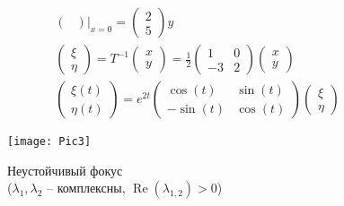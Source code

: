 \begin{figure}[!h]
\begin{minipage}[h]{0.49\linewidth}
\begin{gather*}
\begin{pmatrix}
			\end{pmatrix}
			|_{x = 0} =
			\begin{pmatrix}
				2 \\ 5
			\end{pmatrix}
			y\\
			\begin{pmatrix}
				\xi \\ \eta
			\end{pmatrix} =
			T^{-1}
			\begin{pmatrix}
				x \\ y
			\end{pmatrix} =
			\frac{1}{2}
			\begin{pmatrix}
				1 & 0\\
				-3 & 2
			\end{pmatrix}
			\begin{pmatrix}
				x \\ y
			\end{pmatrix}\\
			\begin{pmatrix}
				\xi\left(t\right) \\ \eta\left(t\right)
			\end{pmatrix}
			= e^{2t}
			\begin{pmatrix}
				\cos\left(t\right) & \sin\left(t\right)\\
				-\sin\left(t\right) & \cos\left(t\right)
			\end{pmatrix}
			\begin{pmatrix}
				\xi \\ \eta
			\end{pmatrix}
		\end{gather*}
	\end{minipage}
	\begin{minipage}[h]{0.49\linewidth}
		\texttt{[image: Pic3]}
		\caption{Неустойчивый фокус \\ ($\lambda_1, \lambda_2$ -- комплексны, $\operatorname{Re}\left(\lambda_{1,2}\right) > 0$)}
	\end{minipage}
\end{figure}


